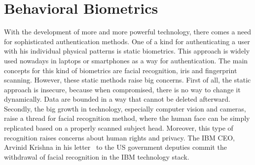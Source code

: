 \section{Behavioral Biometrics}\label{sec:behavioral-biometrics}
With the development of more and more powerful technology, there comes a need for sophisticated authentication methods.
One of a kind for authenticating a user with his individual physical patterns is static biometrics.
This approach is widely used nowadays in laptops or smartphones as a way for authentication.
The main concepts for this kind of biometrics are facial recognition, iris and fingerprint scanning.
However, these static methods raise big concerns.
First of all, the static approach is insecure, because when compromised, there is no way to change it dynamically.
Data are bounded in a way that cannot be deleted afterward.
Secondly, the big growth in technology, especially computer vision and cameras, raise a thread for facial recognition method, where the human face can be simply replicated based on a properly scanned subject head.
Moreover, this type of recognition raises concerns about human rights and privacy.
The IBM CEO, Arvinid Krishna in his letter~\cite{ibm_2020} to the US government deputies commit the withdrawal of facial recognition in the IBM technology stack.

